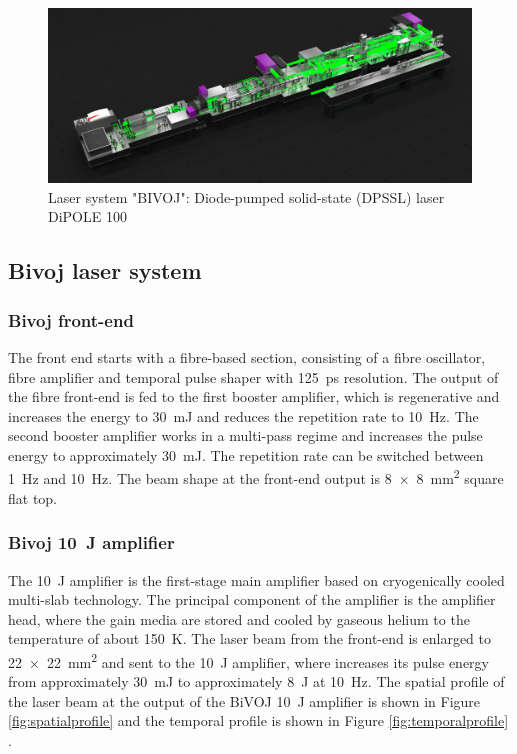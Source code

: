 \begin{figure}[h]
    \centering
    \includegraphics[width=1.0\linewidth]{img/bivoj.jpg}
    \caption{Laser system "BIVOJ": Diode-pumped solid-state (DPSSL) laser DiPOLE 100}
    \label{fig:bivoj}
\end{figure}

\subsection{Bivoj laser system}

\subsubsection*{Bivoj front-end}

The front end starts with a fibre-based section, consisting
of a fibre oscillator, fibre amplifier and temporal pulse shaper
with \SI{125}{\ps} resolution. The output of the fibre front-end is fed
to the first booster amplifier, which is regenerative and
increases the energy to \SI{30}{\milli\joule} and reduces the repetition rate to \SI{10}{\hertz}. The second booster amplifier works in a multi-pass regime
and increases the pulse energy to approximately \SI{30}{\milli\joule}.
The repetition rate can be switched between \SI{1}{\hertz} and \SI{10}{\hertz}. The
beam shape at the front-end output is \SI{8 x 8}{\mm\squared} square flat top.

\subsubsection*{Bivoj \SI{10}{\joule} amplifier}

The \SI{10}{\joule}  amplifier is the first-stage main amplifier based on
cryogenically cooled multi-slab technology. The principal
component of the amplifier is the amplifier head, where the
gain media are stored and cooled by gaseous helium to 
the temperature of about \SI{150}{\kelvin}. The laser beam from the front-end
is enlarged to \SI{22 x 22}{\mm\squared} and sent to the \SI{10}{\joule} amplifier, where
increases its pulse energy from approximately \SI{30}{\milli\joule} to
approximately \SI{8}{\joule} at \SI{10}{\hertz}. The spatial profile of the laser beam at the output of the BiVOJ \SI{10}{\joule} amplifier is shown in Figure \ref{fig:spatialprofile} and the temporal profile is shown in Figure \ref{fig:temporalprofile} \cite{saumyabrata}.

